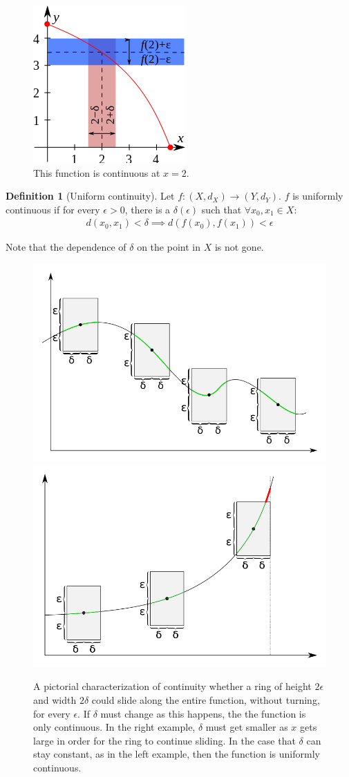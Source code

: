 \documentclass[11pt]{article}
\newcommand{\e}{\epsilon}
\theoremstyle{plain}
\theoremstyle{definition}
\newtheorem{defi}{Definition}[section]
\theoremstyle{remark}
\begin{document}
\clearpage
\begin{figure}
    \centering
    \includegraphics[width=0.5\linewidth]{figures/continuous.png}
    \caption{This function is continuous at $x = 2$.}
\end{figure}
\begin{defi}[Uniform continuity]
    Let $f: (X, d_X) \rightarrow (Y, d_Y)$. $f$ is uniformly continuous if for every $\e > 0$, there is a $\delta(\e)$ such that $\forall x_0, x_1 \in X$:
    \begin{align*}
        d(x_0, x_1) < \delta \implies d(f(x_0), f(x_1)) < \e
    \end{align*}
\end{defi}
Note that the dependence of $\delta$ on the point in $X$ is not gone.
\clearpage
\begin{figure}
    \centering
    \includegraphics[width=0.494\linewidth]{figures/uniform.png}
    \includegraphics[width=0.494\linewidth]{figures/not_uniform.png}
    \caption{A pictorial characterization of continuity whether a ring of height $2\e$ and width $2\delta$ could slide along the entire function, without turning, for every $\e$. If $\delta$ must change as this happens, the the function is only continuous. In the right example, $\delta$ must get smaller as $x$ gets large in order for the ring to continue sliding. In the case that $\delta$ can stay constant, as in the left example, then the function is uniformly continuous.}
    \label{fig:cont}
\end{figure}
\end{document}
